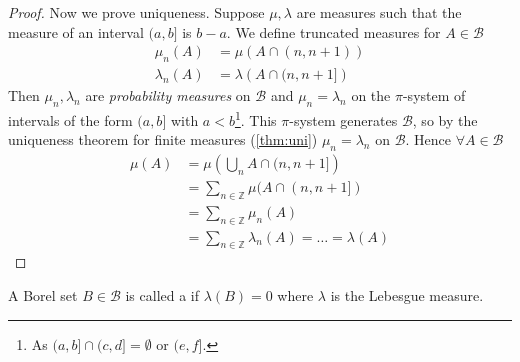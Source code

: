 \begin{proof}
	Now we prove uniqueness.
	Suppose $\mu, \lambda$ are measures such that the measure of an interval $(a,b]$ is $b - a$.
	We define truncated measures for $A \in \mathcal{B}$
	\begin{align*}
		\mu_n(A) &= \mu \left( A \cap (n,n+1) \right) \\
		\lambda_n(A) &= \lambda \left( A \cap (n,n+1] \right)
	\end{align*}
	Then $\mu_n, \lambda_n$ are \emph{probability measures} on $\mathcal{B}$ and $\mu_n = \lambda_n$ on the $\pi$-system of intervals of the form $(a, b]$ with $a < b$\footnote{As $(a, b] \cap (c, d] = \emptyset$ or $(e, f]$.}.
	This $\pi$-system generates $\mathcal{B}$, so by the uniqueness theorem for finite measures (\cref{thm:uni}) $\mu_n = \lambda_n$ on $\mathcal B$.
	Hence $\forall A \in \mathcal{B}$
	\begin{align*}
		\mu(A) &= \mu\left(\bigcup_n A \cap (n,n+1]\right) \\
		&= \sum_{n \in \mathbb Z} \mu(A \cap (n,n+1]) \\
		&= \sum_{n \in \mathbb Z} \mu_n(A) \\
		&= \sum_{n \in \mathbb Z} \lambda_n(A) = \dots = \lambda(A)
	\end{align*}
\end{proof}

\begin{definition}
	A Borel set $B \in \mathcal B$ is called a  if $\lambda(B) = 0$ where $\lambda$ is the Lebesgue measure.
\end{definition}

